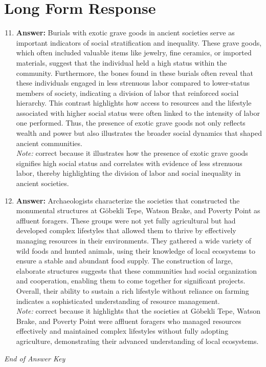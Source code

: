 \documentclass[12pt]{article}
\begin{document}
\section*{Long Form Response}
\begin{enumerate}[label=\arabic*.]
\setcounter{enumi}{10}
\item \textbf{Answer:} Burials with exotic grave goods in ancient societies serve as important indicators of social stratification and inequality. These grave goods, which often included valuable items like jewelry, fine ceramics, or imported materials, suggest that the individual held a high status within the community. Furthermore, the bones found in these burials often reveal that these individuals engaged in less strenuous labor compared to lower-status members of society, indicating a division of labor that reinforced social hierarchy. This contrast highlights how access to resources and the lifestyle associated with higher social status were often linked to the intensity of labor one performed. Thus, the presence of exotic grave goods not only reflects wealth and power but also illustrates the broader social dynamics that shaped ancient communities.
\\ \textit{Note:} correct because it illustrates how the presence of exotic grave goods signifies high social status and correlates with evidence of less strenuous labor, thereby highlighting the division of labor and social inequality in ancient societies.
\item \textbf{Answer:} Archaeologists characterize the societies that constructed the monumental structures at Göbekli Tepe, Watson Brake, and Poverty Point as affluent foragers. These groups were not yet fully agricultural but had developed complex lifestyles that allowed them to thrive by effectively managing resources in their environments. They gathered a wide variety of wild foods and hunted animals, using their knowledge of local ecosystems to ensure a stable and abundant food supply. The construction of large, elaborate structures suggests that these communities had social organization and cooperation, enabling them to come together for significant projects. Overall, their ability to sustain a rich lifestyle without reliance on farming indicates a sophisticated understanding of resource management.
\\ \textit{Note:} correct because it highlights that the societies at Göbekli Tepe, Watson Brake, and Poverty Point were affluent foragers who managed resources effectively and maintained complex lifestyles without fully adopting agriculture, demonstrating their advanced understanding of local ecosystems.
\end{enumerate}

\vfill
\noindent\textit{End of Answer Key}
\end{document}
